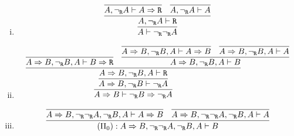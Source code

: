 \begin{enumerate}[(i)]
        \item 
            $$
                \infer{
                    A\vdash \neg_\R\neg_\R A
                }{
                    \infer{
                        A, \neg_\R A \vdash \R
                    }{
                        \infer{
                            A, \neg_\R A \vdash A\Rightarrow \R
                        }{
                        }&
                        \infer{
                            A, \neg_\R A \vdash A
                        }{
                        }
                    }
                }
            $$
        \item
            $$
                \infer{
                    A\Rightarrow B \vdash \neg_\R B \Rightarrow \neg_\R A
                }{
                    \infer{
                        A\Rightarrow B, \neg_\R B \vdash \neg_\R A
                    }{
                        \infer{
                            A\Rightarrow B, \neg_\R B,A \vdash \R
                        }{
                            \infer{
                                A\Rightarrow B, \neg_\R B,A \vdash B\Rightarrow \R
                            }{
                            }&
                            \infer{
                                A\Rightarrow B, \neg_\R B,A \vdash B
                            }{
                                \infer{
                                    A\Rightarrow B, \neg_\R B,A \vdash A\Rightarrow B
                                }{
                                }&
                                \infer{
                                    A\Rightarrow B, \neg_\R B,A \vdash A
                                }{
                                }
                            }
                        }
                    }
                }
            $$
        \item
            $$
                \infer{
                                        (\Pi_0) : A\Rightarrow B, \neg_\R\neg_\R A,\neg_\R B, A\vdash B
                                    }{
                                        \infer{
                                            A\Rightarrow B, \neg_\R\neg_\R A,\neg_\R B, A\vdash A\Rightarrow B
                                        }{
                                        }&
                                        \infer{
                                            A\Rightarrow B, \neg_\R\neg_\R A,\neg_\R B, A\vdash A
                                        }{
                                        }
                                    }
            $$


\end{enumerate}
